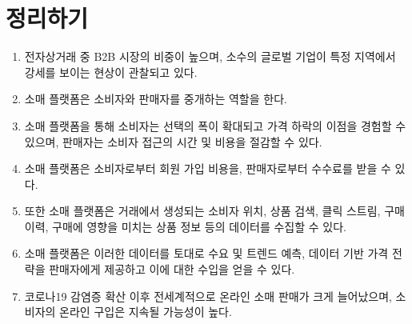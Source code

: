 \pagebreak

\section*{정리하기}
\begin{enumerate}
\item 전자상거래 중 B2B 시장의 비중이 높으며, 소수의 글로벌 기업이 특정 지역에서 강세를 보이는 현상이 관찰되고 있다.
\item 소매 플랫폼은 소비자와 판매자를 중개하는 역할을 한다.
\item 소매 플랫폼을 통해 소비자는 선택의 폭이 확대되고 가격 하락의 이점을 경험할 수 있으며, 판매자는 소비자 접근의 시간 및 비용을 절감할 수 있다.
\item 소매 플랫폼은 소비자로부터 회원 가입 비용을, 판매자로부터 수수료를 받을 수 있다.
\item 또한 소매 플랫폼은 거래에서 생성되는 소비자 위치, 상품 검색, 클릭 스트림, 구매 이력, 구매에 영향을 미치는 상품 정보 등의  데이터를 수집할 수 있다.
\item 소매 플랫폼은 이러한 데이터를 토대로 수요 및 트렌드 예측, 데이터 기반 가격 전략을 판매자에게 제공하고 이에 대한 수입을 얻을 수 있다.
\item 코로나19 감염증 확산 이후 전세계적으로 온라인 소매 판매가 크게 늘어났으며, 소비자의 온라인 구입은 지속될 가능성이 높다.
\end{enumerate}